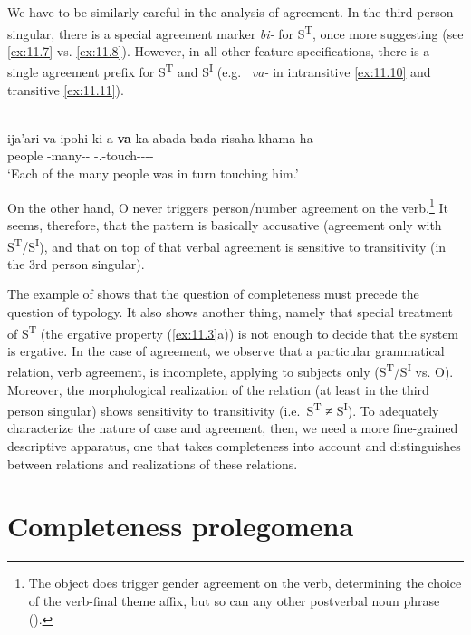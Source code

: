 \documentclass[output=paper]{langsci/langscibook}
\begin{document}
We have to be similarly careful in the analysis of  agreement. In the
third person singular, there is a special agreement marker \emph{bi-} for
S\textsuperscript{T}, once more suggesting  (see \ref{ex:11.7} vs. \ref{ex:11.8}).
However, in all other feature specifications, there is a single agreement
prefix for S\textsuperscript{T} and S\textsuperscript{I} (e.g.\ \Tpl{}
\emph{va-} in intransitive \eqref{ex:11.10} and transitive \eqref{ex:11.11}).

\ea%
    \label{ex:11.11}  \parencite[281]{ChapmanDerbyshire1991}\\
    \gll ija'ari  va-ipohi-ki-a \textbf{va}-ka-abada-bada-risaha-khama-ha\\
        people  \Tpl{}-many-\Desc-\Erg{} \Tpl-\Tr.\Distr{}-touch-\Red{}-\Iter-\Distr-\Th{}\\
    \glt ‘Each of the many people was in turn touching him.’
\z

On the other hand, O never triggers person/number agreement on the
verb.\footnote{The object does trigger gender agreement on the verb,
determining the choice of the verb-final theme affix, but so can any other
postverbal noun phrase (\citealt[288]{ChapmanDerbyshire1991}).} It seems,
therefore, that the pattern is basically accusative (agreement only with
S\textsuperscript{T}/S\textsuperscript{I}), and that on top of that verbal
agreement is sensitive to transitivity (in the 3rd person singular).

The example of  shows that the question of completeness must precede the
question of  typology. It also shows another thing, namely that
special treatment of S\textsuperscript{T} (the ergative property (\ref{ex:11.3}a)) is not
enough to decide that the system is ergative. In the case of  agreement,
we observe that a particular grammatical relation, verb agreement, is
incomplete, applying to subjects only
(S\textsuperscript{T}/S\textsuperscript{I} vs. O). Moreover, the morphological
realization of the relation (at least in the third person singular) shows
sensitivity to transitivity (i.e.\ S\textsuperscript{T} ≠ S\textsuperscript{I}).
To adequately characterize the nature of  case and agreement, then, we
need a more fine-grained descriptive apparatus, one that takes completeness
into account and distinguishes between relations and realizations of these
relations.

\section{Completeness prolegomena}\label{sec:11.3}
\end{document}
